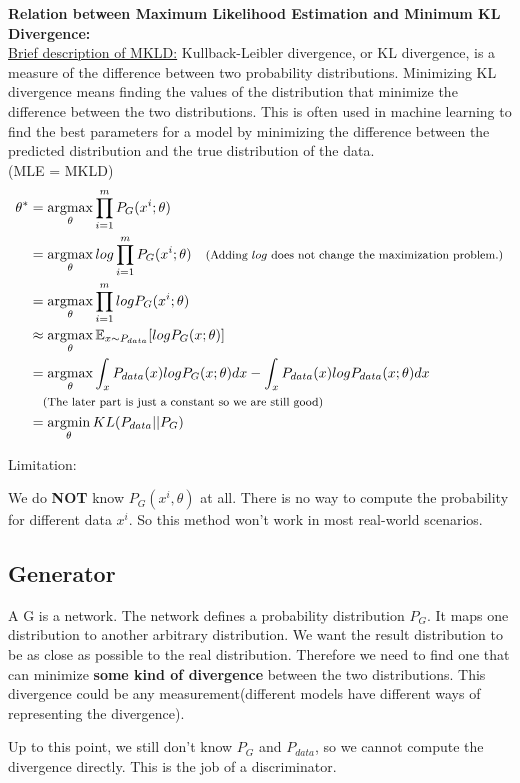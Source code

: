 \documentclass{../templates/ainote}
\begin{document}
\begin{supp}
    \textbf{Relation between Maximum Likelihood Estimation and Minimum KL Divergence:}\\
    \underline{Brief description of MKLD:} Kullback-Leibler divergence, or KL divergence, is a measure of the difference between two probability distributions. Minimizing KL divergence means finding the values of the distribution that minimize the difference between the two distributions. This is often used in machine learning to find the best parameters for a model by minimizing the difference between the predicted distribution and the true distribution of the data. \\
    \proof  (MLE = MKLD) 
    \begin{align*}
    \label{equ:mle2mkld}
        \theta^\ast&=\operatorname*{argmax}_{\theta}\prod_{i=1}^{m}P_G(x^i;\theta) \\
        &=\operatorname*{argmax}_{\theta}log\prod_{i=1}^{m}P_G(x^i;\theta) \quad \text{\footnotesize{(Adding $log$ does not change the maximization problem.)}}\\
        &=\operatorname*{argmax}_{\theta}\prod_{i=1}^{m}logP_G(x^i;\theta) \\
        &\approx \operatorname*{argmax}_{\theta} \mathbb{E}_{x\sim P_{data}}[logP_G(x;\theta)] \\
        &=\operatorname*{argmax}_{\theta} \int_{x} P_{data}(x)logP_G(x;\theta)dx - \int_{x} P_{data}(x)logP_{data}(x;\theta)dx \\
        &\quad \text{\footnotesize{(The later part is just a constant so we are still good)}}\\
        &=\operatorname*{argmin}_{\theta} KL(P_{data} || P_G)
    \end{align*}
\end{supp}
Limitation:
\begin{note}
    We do \textbf{NOT} know $P_G(x^i,\theta)$ at all. There is no way to compute the probability for different data $x^i$. So this method won't work in most real-world scenarios.
\end{note}

\subsection{Generator} \label{Generator}
A  G is a network. The network defines a probability distribution $P_G$. It maps one distribution to another arbitrary distribution.
We want the result distribution to be as close as possible to the real distribution. Therefore we need to find one that can minimize \textbf{some kind of divergence}  between the two distributions. This divergence could be any measurement(different models have different ways of representing the divergence).
\begin{note}
    Up to this point, we still don't know $P_G$ and $P_{data}$, so we cannot compute the divergence directly. This is the job of a discriminator.
\end{note}
\end{document}
